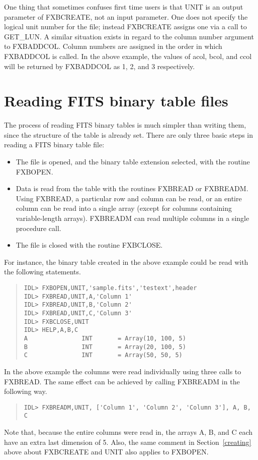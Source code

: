 One thing that sometimes confuses first time users is that UNIT is an output
parameter of FXBCREATE, not an input parameter.  One does not specify the
logical unit number for the file; instead FXBCREATE assigns one via a call to
GET\_LUN.  A similar situation exists in regard to the column number argument
to FXBADDCOL.  Column numbers are assigned in the order in which FXBADDCOL is
called.  In the above example, the values of acol, bcol, and ccol will be
returned by FXBADDCOL as 1, 2, and 3 respectively.

\section{Reading FITS binary table files}

The process of reading FITS binary tables is much simpler than writing them,
since the structure of the table is already set.  There are only three basic
steps in reading a FITS binary table file:
%
\begin{itemize}
\item
	The file is opened, and the binary table extension selected, with the
	routine FXBOPEN.
\item
	Data is read from the table with the routines FXBREAD or
	FXBREADM.  Using FXBREAD, a particular row and column can be
	read, or an entire column can be read into a single array
	(except for columns containing variable-length arrays).
	FXBREADM can read multiple columns in a single procedure call.
\item
	The file is closed with the routine FXBCLOSE.
\end{itemize}
%
For instance, the binary table created in the above example could be read with
the following statements.
%
\begin{quote}
\begin{verbatim}
IDL> FXBOPEN,UNIT,'sample.fits','testext',header
IDL> FXBREAD,UNIT,A,'Column 1'
IDL> FXBREAD,UNIT,B,'Column 2'
IDL> FXBREAD,UNIT,C,'Column 3'
IDL> FXBCLOSE,UNIT
IDL> HELP,A,B,C
A               INT       = Array(10, 100, 5)
B               INT       = Array(20, 100, 5)
C               INT       = Array(50, 50, 5)
\end{verbatim}
\end{quote}
%
In the above example the columns were read individually using three
calls to FXBREAD.  The same effect can be achieved by calling FXBREADM
in the following way.
%
\begin{quote}
\begin{verbatim}
IDL> FXBREADM,UNIT, ['Column 1', 'Column 2', 'Column 3'], A, B, C
\end{verbatim}
\end{quote}
%
Note that, because the entire columns were read in, the arrays A, B, and C each
have an extra last dimension of 5.  Also, the same comment in
Section~\ref{creating} above about FXBCREATE and UNIT also applies to FXBOPEN.

